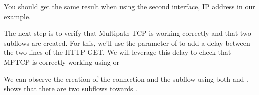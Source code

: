 \documentclass[letterpaper,10pt,english]{sphinxmanual}
\begin{document}
\sphinxAtStartPar
You should get the same result when using the second interface, IP address  in our example.

\begin{sphinxVerbatim}[commandchars=\\\{\}]
\end{sphinxVerbatim}

\sphinxAtStartPar
The next step is to verify that Multipath TCP is working correctly and that two subflows are created. For this, we’ll use the  parameter of  to add a delay between the two lines of the HTTP GET. We will leverage this delay to check that MPTCP is correctly working using  or 

\begin{sphinxVerbatim}[commandchars=\\\{\}]
\end{sphinxVerbatim}

\sphinxAtStartPar
We can observe the creation of the connection and the subflow using both  and .  shows that there are two subflows towards .
\end{document}
